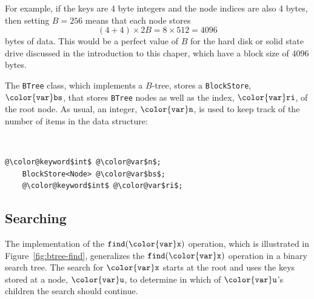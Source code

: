 \documentclass[10pt]{book}
\newcommand{\pcodeimport}[1]{}
\newcommand{\figref}[1]{Figure~\ref{fig:#1}}
\theoremstyle{plain}
\theoremstyle{definition}
\begin{document}
For example, if the keys are 4 byte integers and the node indices are
also 4 bytes, then setting $B=256$ means that each node stores
\[
(4+4)\times 2B
 = 8\times512=4096
\]
bytes of data.  This would be a perfect value of $B$ for the hard disk
or solid state drive discussed in the introduction to this chaper,
which have a block size of $4096$ bytes.

The \texttt{BTree} class, which implements a $B$-tree, stores a \texttt{BlockStore},
\ensuremath{\mathtt{{\color{var}bs}}}, that stores \texttt{BTree} nodes as well as the index, \ensuremath{\mathtt{{\color{var}ri}}}, of the
root node.  As usual, an integer, \ensuremath{\mathtt{{\color{var}n}}}, is used to keep track of the number
of items in the data structure:


 \ \vspace{.5ex}\begin{Verbatim}[gobble=1,tabsize=2,frame=single,framerule=1.2pt,commandchars=\\@\$,label=\texttt{BTree},labelposition=topline]
	@\color@keyword$int$ @\color@var$n$;
	BlockStore<Node> @\color@var$bs$;
	@\color@keyword$int$ @\color@var$ri$;
\end{Verbatim}

\pcodeimport{ods/BTree.initialize(b)}

\subsection{Searching}

The implementation of the \ensuremath{\mathtt{find({\color{var}x})}} operation, which is illustrated in
\figref{btree-find}, generalizes the \ensuremath{\mathtt{find({\color{var}x})}} operation in a binary
search tree.  The search for \ensuremath{\mathtt{{\color{var}x}}} starts at the root and uses the keys
stored at a node, \ensuremath{\mathtt{{\color{var}u}}}, to determine in which of \ensuremath{\mathtt{{\color{var}u}}}'s children the search
should continue.
\end{document}

